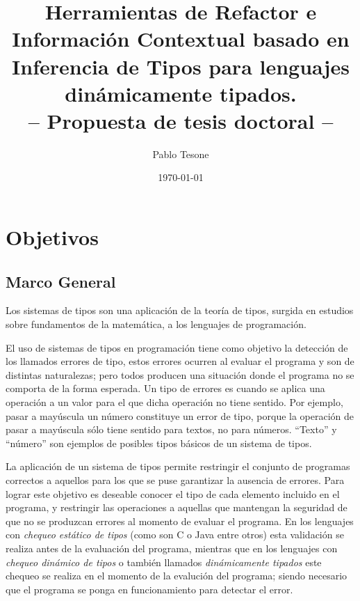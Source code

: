 \documentclass[a4paper,10pt]{article}
\title{Herramientas de Refactor e Información Contextual basado en Inferencia de Tipos para lenguajes dinámicamente tipados.\\
-- Propuesta de tesis doctoral -- }
\author{Pablo Tesone}
\date{\today}
\begin{document}
\maketitle

\section{Objetivos}
\subsection{Marco General}

Los sistemas de tipos\cite{Pier02a} son una aplicación de la teoría de tipos\cite{Pier02a}, surgida en estudios sobre fundamentos de la matemática, a los lenguajes de programación. 

El uso de sistemas de tipos en programación tiene como objetivo la detección de los llamados errores de tipo\cite{Miln78a}, estos errores ocurren al evaluar el programa y son de distintas naturalezas; pero todos producen una situación donde el programa no se comporta de la forma esperada. Un tipo de errores es cuando se aplica una operación a un valor para el que dicha operación no tiene sentido. Por ejemplo, pasar a mayúscula un número constituye un error de tipo, porque la operación de pasar a mayúscula sólo tiene sentido para textos, no para números.  
``Texto'' y ``número'' son ejemplos de posibles tipos básicos de un sistema de tipos.


La aplicación de un sistema de tipos permite restringir el conjunto de programas correctos a aquellos para los que se puse garantizar la ausencia de errores. Para lograr este objetivo es deseable conocer el tipo de cada elemento incluido en el programa, y restringir las operaciones a aquellas que mantengan la seguridad de que no se produzcan errores al momento de evaluar el programa. En los lenguajes con \emph{chequeo estático de tipos} (como son C o Java entre otros) esta validación se realiza antes de la evaluación del programa, mientras que en los lenguajes con \emph{chequeo dinámico de tipos} o también llamados \emph{dinámicamente tipados}\cite{Pier02a,Card85c} este chequeo se realiza en el momento de la evalución del programa; siendo necesario que el programa se ponga en funcionamiento para detectar el error. 
\end{document}
